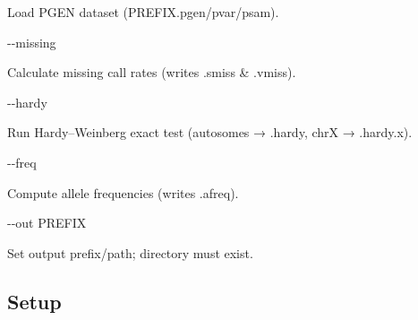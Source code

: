 \documentclass[
]{article}
\begin{document}
Load PGEN dataset (PREFIX.pgen/pvar/psam).

-\/-missing

Calculate missing call rates (writes .smiss \& .vmiss).

-\/-hardy

Run Hardy--Weinberg exact test (autosomes → .hardy, chrX → .hardy.x).

-\/-freq

Compute allele frequencies (writes .afreq).

-\/-out PREFIX

Set output prefix/path; directory must exist.

\subsection{Setup}\label{setup}
\end{document}
